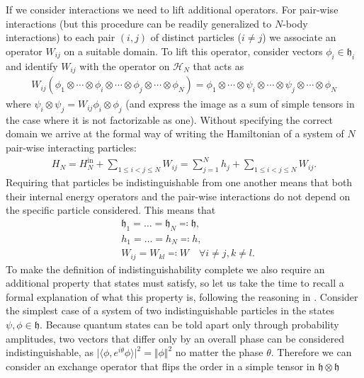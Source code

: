 If we consider interactions we need to lift additional operators. For pair-wise interactions
(but this procedure can be readily generalized to $N$-body interactions) to each pair $(i,j)$ of
distinct particles ($i\neq j$) we associate an operator $W_{ij}$ on a suitable domain. To lift
this operator, consider vectors $\phi_i\in\mathfrak{h}_i$ and identify $W_{ij}$ with the
operator on $\mathcal{H}_N$ that acts as
\begin{align*}
	W_{ij}(\phi_1\otimes\cdots\otimes\phi_i\otimes\cdots\otimes\phi_j\otimes\cdots\otimes\phi_N)
	= \phi_1\otimes\cdots\otimes\psi_i\otimes\cdots\otimes\psi_j\otimes\cdots\otimes\phi_N
\end{align*}
where $\psi_i\otimes\psi_j = W_{ij}\phi_i\otimes\phi_j$ (and express the image as
a sum of simple tensors in the case where it is not factorizable as one). Without specifying
the correct domain we arrive at the formal way of writing the Hamiltonian of a system of $N$
pair-wise interacting particles:
\begin{align}
	\label{our-system}
	H_N = H_N^{\mathrm{in}} + \sum_{1\leq i < j\leq N} W_{ij} = \sum_{j=1}^N h_j + \sum_{1\leq i<j\leq N} W_{ij}.
\end{align}
Requiring that particles be indistinguishable from one another means that both their internal
energy operators and the pair-wise interactions do not depend on the specific particle
considered. This means that
\begin{align}
	\label{indistinguishable-operators}
	&\mathfrak{h}_1 = \ldots = \mathfrak{h}_N \eqcolon \mathfrak{h},\nonumber\\
	&h_1 = \ldots = h_N \eqcolon h,\\
	&W_{ij} = W_{kl} \eqcolon W \quad \forall i\neq j, k\neq l.\nonumber
\end{align}
To make the definition of indistinguishability complete we also require an additional property
that states must satisfy, so let us take the time to recall a formal explanation of what this
property is, following the reasoning in \cite[p.~302]{ForBook}. Consider the simplest case of
a system of two indistinguishable particles in the states $\psi,\phi\in \mathfrak{h}$. Because
quantum states can be told apart only through probability amplitudes, two vectors that differ
only by an overall phase can be considered indistinguishable, as $\vert\langle\phi,e^{i\theta}
\phi\rangle\vert^2=\Vert\phi\Vert^2$ no matter the phase $\theta$. Therefore we can consider
an exchange operator that flips the order in a simple tensor in $\mathfrak{h}\otimes\mathfrak{h}$
